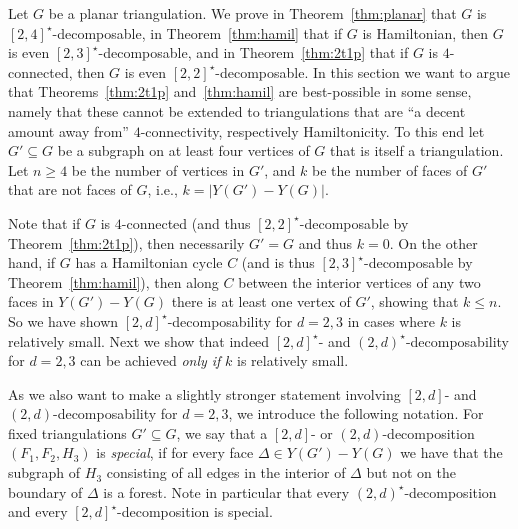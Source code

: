 \documentclass[a4paper,10pt]{article}
\theoremstyle{plain}
\begin{document}
Let $G$ be a planar triangulation.
We prove in Theorem~\ref{thm:planar} that $G$ is $[2,4]^\star$-decomposable, in Theorem~\ref{thm:hamil} that if $G$ is Hamiltonian, then $G$ is even $[2,3]^\star$-decomposable, and in Theorem~\ref{thm:2t1p} that if $G$ is $4$-connected, then $G$ is even $[2,2]^\star$-decomposable.
In this section we want to argue that Theorems~\ref{thm:2t1p} and~\ref{thm:hamil} are best-possible in some sense, namely that these cannot be extended to triangulations that are ``a decent amount away from'' $4$-connectivity, respectively Hamiltonicity.
To this end let $G' \subseteq G$ be a subgraph on at least four vertices of $G$ that is itself a triangulation.
Let $n \geq 4$ be the number of vertices in $G'$, and $k$ be the number of faces of $G'$ that are not faces of $G$, i.e., $k = |Y(G')-Y(G)|$.

Note that if $G$ is $4$-connected (and thus $[2,2]^\star$-decomposable by Theorem~\ref{thm:2t1p}), then necessarily $G' = G$ and thus $k = 0$.
On the other hand, if $G$ has a Hamiltonian cycle $C$ (and is thus $[2,3]^\star$-decomposable by Theorem~\ref{thm:hamil}), then along $C$ between the interior vertices of any two faces in $Y(G')-Y(G)$ there is at least one vertex of $G'$, showing that $k \leq n$.
So we have shown $[2,d]^\star$-decomposability for $d=2,3$ in cases where $k$ is relatively small.
Next we show that indeed $[2,d]^\star$- and $(2,d)^\star$-decomposability for $d=2,3$ can be achieved \emph{only if} $k$ is relatively small.

As we also want to make a slightly stronger statement involving $[2,d]$- and $(2,d)$-decomposability for $d=2,3$, we introduce the following notation.
For fixed triangulations $G' \subseteq G$, we say that a $[2,d]$- or $(2,d)$-decomposition $(F_1,F_2,H_3)$ is \emph{special}, if for every face $\Delta \in Y(G')-Y(G)$ we have that the subgraph of $H_3$ consisting of all edges in the interior of $\Delta$ but not on the boundary of $\Delta$ is a forest.
Note in particular that every $(2,d)^\star$-decomposition and every $[2,d]^\star$-decomposition is special.
\end{document}
